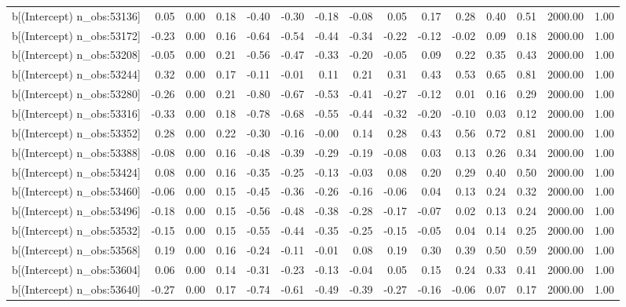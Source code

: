 \begin{table}[ht]
\begin{tabular}{rrrrrrrrrrrrrrr}
  b[(Intercept) n\_obs:53136] & 0.05 & 0.00 & 0.18 & -0.40 & -0.30 & -0.18 & -0.08 & 0.05 & 0.17 & 0.28 & 0.40 & 0.51 & 2000.00 & 1.00 \\ 
  b[(Intercept) n\_obs:53172] & -0.23 & 0.00 & 0.16 & -0.64 & -0.54 & -0.44 & -0.34 & -0.22 & -0.12 & -0.02 & 0.09 & 0.18 & 2000.00 & 1.00 \\ 
  b[(Intercept) n\_obs:53208] & -0.05 & 0.00 & 0.21 & -0.56 & -0.47 & -0.33 & -0.20 & -0.05 & 0.09 & 0.22 & 0.35 & 0.43 & 2000.00 & 1.00 \\ 
  b[(Intercept) n\_obs:53244] & 0.32 & 0.00 & 0.17 & -0.11 & -0.01 & 0.11 & 0.21 & 0.31 & 0.43 & 0.53 & 0.65 & 0.81 & 2000.00 & 1.00 \\ 
  b[(Intercept) n\_obs:53280] & -0.26 & 0.00 & 0.21 & -0.80 & -0.67 & -0.53 & -0.41 & -0.27 & -0.12 & 0.01 & 0.16 & 0.29 & 2000.00 & 1.00 \\ 
  b[(Intercept) n\_obs:53316] & -0.33 & 0.00 & 0.18 & -0.78 & -0.68 & -0.55 & -0.44 & -0.32 & -0.20 & -0.10 & 0.03 & 0.12 & 2000.00 & 1.00 \\ 
  b[(Intercept) n\_obs:53352] & 0.28 & 0.00 & 0.22 & -0.30 & -0.16 & -0.00 & 0.14 & 0.28 & 0.43 & 0.56 & 0.72 & 0.81 & 2000.00 & 1.00 \\ 
  b[(Intercept) n\_obs:53388] & -0.08 & 0.00 & 0.16 & -0.48 & -0.39 & -0.29 & -0.19 & -0.08 & 0.03 & 0.13 & 0.26 & 0.34 & 2000.00 & 1.00 \\ 
  b[(Intercept) n\_obs:53424] & 0.08 & 0.00 & 0.16 & -0.35 & -0.25 & -0.13 & -0.03 & 0.08 & 0.20 & 0.29 & 0.40 & 0.50 & 2000.00 & 1.00 \\ 
  b[(Intercept) n\_obs:53460] & -0.06 & 0.00 & 0.15 & -0.45 & -0.36 & -0.26 & -0.16 & -0.06 & 0.04 & 0.13 & 0.24 & 0.32 & 2000.00 & 1.00 \\ 
  b[(Intercept) n\_obs:53496] & -0.18 & 0.00 & 0.15 & -0.56 & -0.48 & -0.38 & -0.28 & -0.17 & -0.07 & 0.02 & 0.13 & 0.24 & 2000.00 & 1.00 \\ 
  b[(Intercept) n\_obs:53532] & -0.15 & 0.00 & 0.15 & -0.55 & -0.44 & -0.35 & -0.25 & -0.15 & -0.05 & 0.04 & 0.14 & 0.25 & 2000.00 & 1.00 \\ 
  b[(Intercept) n\_obs:53568] & 0.19 & 0.00 & 0.16 & -0.24 & -0.11 & -0.01 & 0.08 & 0.19 & 0.30 & 0.39 & 0.50 & 0.59 & 2000.00 & 1.00 \\ 
  b[(Intercept) n\_obs:53604] & 0.06 & 0.00 & 0.14 & -0.31 & -0.23 & -0.13 & -0.04 & 0.05 & 0.15 & 0.24 & 0.33 & 0.41 & 2000.00 & 1.00 \\ 
  b[(Intercept) n\_obs:53640] & -0.27 & 0.00 & 0.17 & -0.74 & -0.61 & -0.49 & -0.39 & -0.27 & -0.16 & -0.06 & 0.07 & 0.17 & 2000.00 & 1.00 \\ 

\end{tabular}
\end{table}
